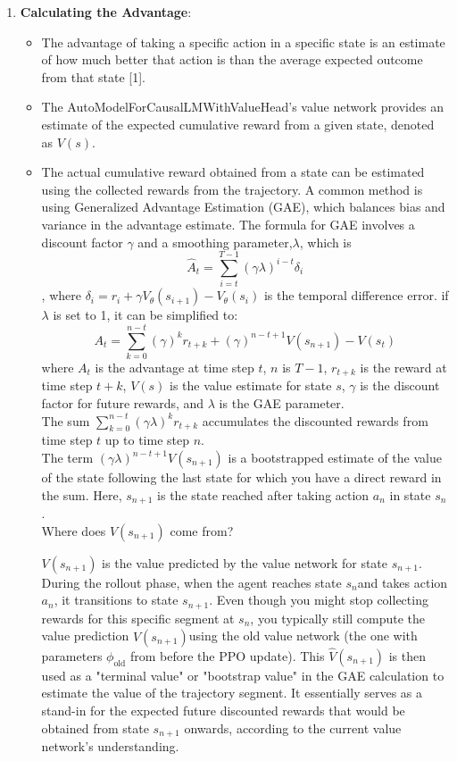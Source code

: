 \documentclass[10pt,a4paper]{report}
\begin{document}
\begin{enumerate}
\item    \textbf{Calculating the Advantage}:
\begin{itemize}
\item         The advantage of taking a specific action in a specific state is an estimate of how much better that action is than the average expected outcome from that state [1].
\item         The AutoModelForCausalLMWithValueHead's value network provides an estimate of the expected cumulative reward from a given state, denoted as $V(s)$.
\item         The actual cumulative reward obtained from a state can be estimated using the collected rewards from the trajectory. A common method is using Generalized Advantage Estimation (GAE), which balances bias and variance in the advantage estimate. The formula for GAE involves a discount factor $\gamma$ and a smoothing parameter,$\lambda$, which is $$\hat{A}_t = \sum_{i=t}^{T-1} (\gamma \lambda)^{i-t} \delta_i$$, where $\delta_i = r_i + \gamma V_\theta(s_{i+1}) - V_\theta(s_i)$ is the temporal difference error. if $\lambda$ is set to 1, it can be simplified to: $$A_t = \sum_{k=0}^{n-t} (\gamma)^k r_{t+k} + (\gamma)^{n-t+1} V(s_{n+1}) - V(s_t)$$ where $A_t$ is the advantage at time step $t$, $n$ is $T-1$, $r_{t+k}$ is the reward at time step $t+k$, $V(s)$ is the value estimate for state $s$, $\gamma$ is the discount factor for future rewards, and $\lambda$ is the GAE parameter. \\
The sum $\sum_{k=0}^{n-t} (\gamma\lambda)^k r_{t+k}$ accumulates the discounted rewards from time step $t$ up to time step $n$.\\
    The term $(\gamma\lambda)^{n-t+1} V(s_{n+1})$ is a bootstrapped estimate of the value of the state following the last state for which you have a direct reward in the sum. Here, $s_{n+1}$ is the state reached after taking action $a_n$ in state $s_n$.\\

Where does $V(s_{n+1})$ come from?

$V(s_{n+1})$ is the value predicted by the value network for state $s_{n+1}$.
    During the rollout phase, when the agent reaches state $s_n$and takes action $a_n$, it transitions to state $s_{n+1}$.
    Even though you might stop collecting rewards for this specific segment at $s_n$, you typically still compute the value prediction $\hat{V}(s_{n+1})$using the old value network (the one with parameters $\phi_{\text{old}}$ from before the PPO update).
    This $\hat{V}(s_{n+1})$ is then used as a "terminal value" or "bootstrap value" in the GAE calculation to estimate the value of the trajectory segment. It essentially serves as a stand-in for the expected future discounted rewards that would be obtained from state $s_{n+1}$ onwards, according to the current value network's understanding.\\


\end{itemize}
\end{enumerate}
\end{document}
